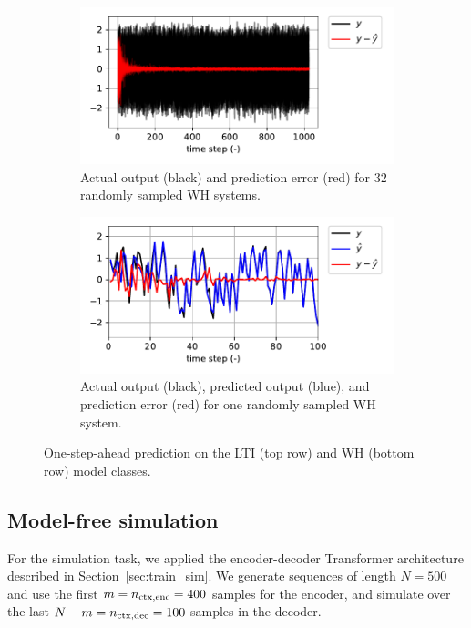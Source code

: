 \documentclass{article}
\newcommand{\nsamp}{N}
\begin{document}
\begin{figure}
    \begin{subfigure}[t]{0.49\textwidth}
        \centering
        \includegraphics[width=\textwidth]{fig/wh_one_step_batch.pdf}
        \caption{Actual output (black) and prediction error (red) for $32$ randomly sampled WH systems.}
        \label{fig:wh_one_step_batch}
    \end{subfigure}
    \hfill
    \begin{subfigure}[t]{0.49\textwidth}
        \centering
        \includegraphics[width=\textwidth]{fig/wh_one_step_single.pdf}
        \caption{Actual output (black), predicted output (blue), and prediction error (red) for one randomly sampled WH system.}
        \label{fig:wh_one_step_single}
    \end{subfigure}

   
    \caption{One-step-ahead prediction on the LTI (top row) and WH (bottom row) model classes.}
    \label{fig:one_step_prediction}
\end{figure}





\subsection{Model-free simulation}
\label{sec:exp_sim}
For the simulation task, we applied the encoder-decoder Transformer architecture described in Section~\ref{sec:train_sim}.  We generate sequences of length $\nsamp=500$ and use the first $m=n_{\rm ctx, enc} = 400$ samples for the 
encoder, and simulate over the last $\nsamp-m=n_{\rm ctx, dec}=100$ samples in the decoder. 
\end{document}
